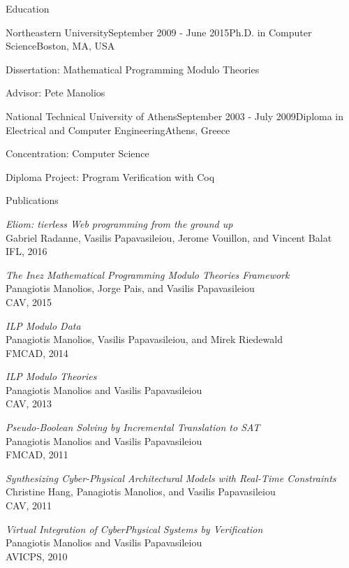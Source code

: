 \documentclass[11pt]{resume}
\begin{document}
\begin{rSection}{Education}

  \begin{rSubsection}{Northeastern University}{September 2009 -
      June 2015}{Ph.D. in Computer Science}{Boston, MA, USA}
  \item Dissertation: Mathematical Programming Modulo Theories
  \item Advisor: Pete Manolios
  \end{rSubsection}

  \begin{rSubsection}{National Technical University of Athens}{September 2003 -
      July 2009}{Diploma in Electrical and Computer
      Engineering}{Athens, Greece}
  \item Concentration: Computer Science
  \item Diploma Project: Program Verification with Coq
  \end{rSubsection}
	
\end{rSection}

\newpage

\begin{rSection}{Publications}

  \emph{Eliom: tierless Web programming from the ground up} \\
  Gabriel Radanne, Vasilis Papavasileiou, Jerome Vouillon, and Vincent
  Balat \\
  IFL, 2016 

  \emph{The Inez Mathematical Programming Modulo Theories Framework} \\
  Panagiotis Manolios, Jorge Pais, and Vasilis Papavasileiou \\
  CAV, 2015

  \emph{ILP Modulo Data} \\
  Panagiotis Manolios, Vasilis Papavasileiou, and Mirek Riedewald \\
  FMCAD, 2014

  \emph{ILP Modulo Theories} \\
  Panagiotis Manolios and Vasilis Papavasileiou \\
  CAV, 2013

  \emph{Pseudo-Boolean Solving by Incremental Translation to SAT} \\
  Panagiotis Manolios and Vasilis Papavasileiou \\
  FMCAD, 2011

  \emph{Synthesizing Cyber-Physical Architectural Models with Real-Time Constraints} \\
  Christine Hang, Panagiotis Manolios, and Vasilis Papavasileiou \\
  CAV, 2011

  \emph{Virtual Integration of CyberPhysical Systems by Verification} \\
  Panagiotis Manolios and Vasilis Papavasileiou \\
  AVICPS, 2010

\end{rSection}
\end{document}

